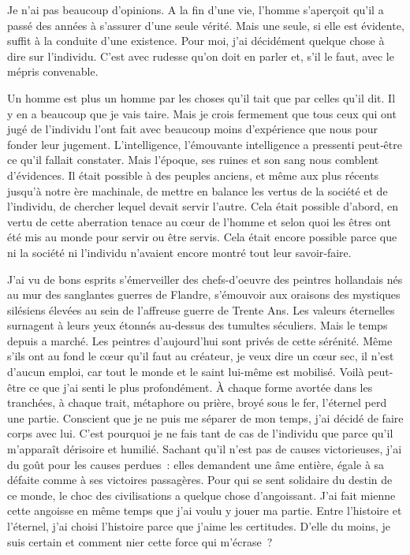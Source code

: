 \documentclass{book}
\begin{document}
Je n'ai pas beaucoup d'opinions. A la fin d'une vie, l'homme s'aperçoit qu'il a passé des années à s'assurer d'une seule vérité. Mais une seule, si elle est évidente, suffit à la conduite d'une existence. Pour moi, j'ai décidément quelque chose à dire sur l'individu. C'est avec rudesse qu'on doit en parler et, s'il le faut, avec le mépris convenable.

Un homme est plus un homme par les choses qu'il tait que par celles qu'il dit. Il y en a beaucoup que je vais taire. Mais je crois fermement que tous ceux qui ont jugé de l'individu l'ont fait avec beaucoup moins d'expérience que nous pour fonder leur jugement. L'intelligence, l'émouvante intelligence a pressenti peut‑être ce qu'il fallait constater. Mais l'époque, ses ruines et son sang nous comblent d'évidences. Il était possible à des peuples anciens, et même aux plus récents jusqu'à notre ère machinale, de mettre en balance les vertus de la société et de l'individu, de chercher lequel devait servir l'autre. Cela était possible d'abord, en vertu de cette aberration tenace au cœur de l'homme et selon quoi les êtres ont été mis au monde pour servir ou être servis. Cela était encore possible parce que ni la société ni l'individu n'avaient encore montré tout leur savoir‑faire.

J'ai vu de bons esprits s'émerveiller des chefs-d'oeuvre des peintres hollandais nés au mur des sanglantes guerres de Flandre, s'émouvoir aux oraisons des mystiques silésiens élevées au sein de l'affreuse guerre de Trente Ans. Les valeurs éternelles surnagent à leurs yeux étonnés au‑dessus des tumultes séculiers. Mais le temps depuis a marché. Les peintres d'aujourd'hui sont privés de cette sérénité. Même s'ils ont au fond le cœur qu'il faut au créateur, je veux dire un cœur sec, il n'est d'aucun emploi, car tout le monde et le saint lui-même est mobilisé. Voilà peut-être ce que j'ai senti le plus profondément. À chaque forme avortée dans les tranchées, à chaque trait, métaphore ou prière, broyé sous le fer, l'éternel perd une partie. Conscient que je ne puis me séparer de mon temps, j'ai décidé de faire corps avec lui. C'est pourquoi je ne fais tant de cas de l'individu que parce qu'il m'apparaît dérisoire et humilié. Sachant qu'il n'est pas de causes victorieuses, j'ai du goût pour les causes perdues : elles demandent une âme entière, égale à sa défaite comme à ses victoires passagères. Pour qui se sent solidaire du destin de ce monde, le choc des civilisations a quelque chose d'angoissant. J'ai fait mienne cette angoisse en même temps que j'ai voulu y jouer ma partie. Entre l'histoire et l'éternel, j'ai choisi l'histoire parce que j'aime les certitudes. D'elle du moins, je suis certain et comment nier cette force qui m'écrase ?
\end{document}
